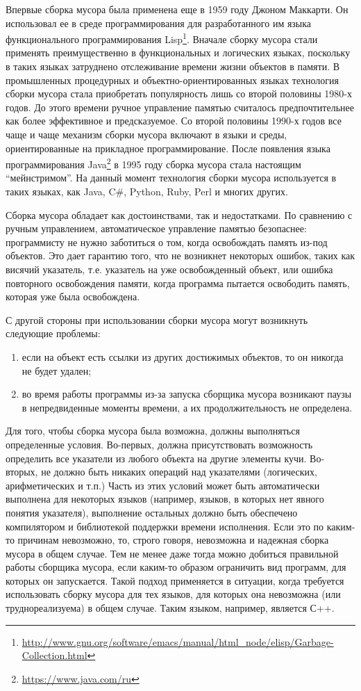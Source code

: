 Впервые сборка мусора была применена еще  в 1959 году Джоном Маккарти. Он использовал ее в среде программирования для 
разработанного им языка функционального программирования Lisp\footnote{\url{http://www.gnu.org/software/emacs/manual/html\_node/elisp/Garbage-Collection.html}}.
Вначале сборку мусора стали применять преимущественно в функциональных и логических языках, поскольку в таких языках затруднено
отслеживание времени жизни объектов в памяти. В промышленных процедурных и объектно-ориентированных языках технология сборки мусора стала 
приобретать популярность лишь со второй половины 1980-х годов. До этого времени ручное управление памятью считалось предпочтительнее как более 
эффективное и предсказуемое. Со второй половины 1990-х годов все чаще и чаще механизм сборки мусора включают в языки и среды, ориентированные 
на прикладное программирование. После появления языка программирования Java\footnote{\url{https://www.java.com/ru}} в 1995 году 
сборка мусора стала настоящим ``мейнстримом''.  На данный момент технология сборки мусора используется в таких языках, как Java, C\#, 
Python, Ruby, Perl и многих других. 

Сборка мусора обладает как достоинствами, так и недостатками. По сравнению с ручным управлением, автоматическое 
управление памятью безопаснее: программисту не нужно заботиться о том, когда освобождать память из-под объектов. 
Это дает гарантию того, что не возникнет некоторых ошибок, таких как висячий указатель, т.е. указатель на уже 
освобожденный объект, или ошибка повторного освобождения памяти, когда программа пытается освободить память, 
которая уже была освобождена.

С другой стороны при использовании сборки мусора могут возникнуть следующие проблемы:

\begin{enumerate}
\item если на объект есть ссылки из других достижимых объектов, то он никогда не будет удален;
\item во время работы программы из-за запуска сборщика мусора возникают паузы в непредвиденные моменты времени, а их 
продолжительность не определена.
\end{enumerate}

Для того, чтобы сборка мусора была возможна, должны выполняться определенные условия. Во-первых, должна присутствовать 
возможность определить все указатели из любого объекта на другие элементы кучи. Во-вторых, не должно быть никаких 
операций над указателями (логических, арифметических и т.п.) Часть из этих условий может быть автоматически выполнена
для некоторых языков (например, языков, в которых нет явного понятия указателя), выполнение остальных должно быть
обеспечено компилятором и библиотекой поддержки времени исполнения. Если это по каким-то причинам невозможно, то, строго
говоря, невозможна и надежная сборка мусора в общем случае. Тем не менее даже тогда можно добиться правильной
работы сборщика мусора, если каким-то образом ограничить вид программ, для которых он запускается. Такой подход применяется 
в ситуации, когда требуется использовать сборку мусора для тех языков, для которых она невозможна (или труднореализуема) 
в общем случае. Таким языком, например, является С++.

